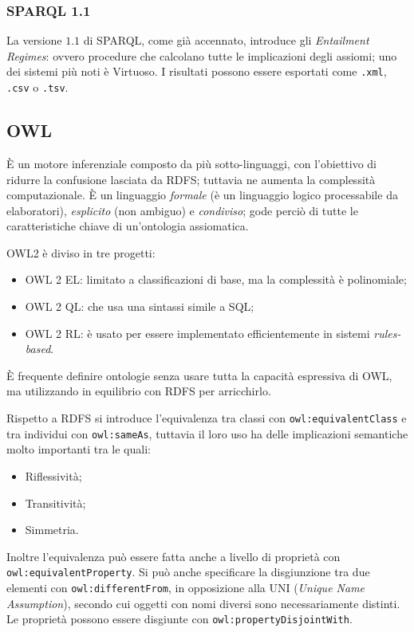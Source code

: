 \documentclass[11pt]{article}
\begin{document}
\subsubsection{SPARQL 1.1}
La versione $1.1$ di SPARQL, come già accennato, introduce gli \textit{Entailment Regimes}: ovvero procedure che calcolano tutte le implicazioni degli assiomi; uno dei sistemi più noti è Virtuoso.
I risultati possono essere esportati come \verb|.xml|, \verb|.csv| o \verb|.tsv|.

\subsection{OWL}
È un motore inferenziale composto da più sotto-linguaggi, con l'obiettivo di ridurre la confusione lasciata da RDFS; tuttavia ne aumenta la complessità computazionale.
È un linguaggio \textit{formale} (è un linguaggio logico processabile da elaboratori), \textit{esplicito} (non ambiguo) e \textit{condiviso}; gode perciò di tutte le caratteristiche chiave di un'ontologia assiomatica.

OWL2 è diviso in tre progetti:
\begin{itemize}
  \item OWL 2 EL: limitato a classificazioni di base, ma la complessità è polinomiale;
  \item OWL 2 QL: che usa una sintassi simile a SQL;
  \item OWL 2 RL: è usato per  essere implementato efficientemente in sistemi \textit{rules-based}.
\end{itemize}
È frequente definire ontologie senza usare tutta la capacità espressiva di OWL, ma utilizzando in equilibrio con RDFS per arricchirlo.

Rispetto a RDFS si introduce l'equivalenza tra classi con \verb|owl:equivalentClass| e tra individui con \verb|owl:sameAs|, tuttavia il loro uso ha delle implicazioni semantiche molto importanti tra le quali:
\begin{itemize}
  \item Riflessività;
  \item Transitività;
  \item Simmetria.
\end{itemize}
Inoltre l'equivalenza può essere fatta anche a livello di proprietà con \verb|owl:equivalentProperty|.
Si può anche specificare la disgiunzione tra due elementi con \verb|owl:differentFrom|, in opposizione alla UNI (\textit{Unique Name Assumption}), secondo cui oggetti con nomi diversi sono necessariamente distinti.
Le proprietà possono essere disgiunte con \verb|owl:propertyDisjointWith|.
\end{document}
